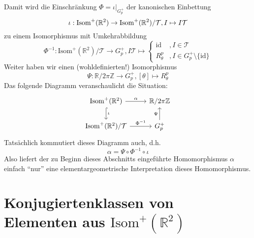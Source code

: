 \documentclass[a4paper, ngerman]{article}
\numberwithin{equation}{chapter}
\theoremstyle{plain}
\theoremstyle{definition}
\newcommand{\id}{\ensuremath{\text{id}}}
\newcommand{\geradisometr}{\ensuremath{\mathrm{Isom}^+(\mathbb R^2)}}
\begin{document}
Damit wird die Einschränkung \(\Phi = \iota|_{G_p^+}\) der kanonischen Einbettung
\begin{equation*}
    \iota: \geradisometr \break \to \geradisometr/\mathcal T, I \mapsto I\mathcal T
\end{equation*}
zu einem Isomorphismus mit Umkehrabbildung 
\begin{equation*}
    \Phi^{-1}: \geradisometr/\mathcal T \to G_p^+, I\mathcal T \mapsto 
    \begin{cases}
        \id &, I \in \mathcal T \\
        R_\theta^p &, I \in G_p^+\setminus \{\id\}
    \end{cases}
\end{equation*}
Weiter haben wir einen (wohldefinierten!) Isomorphismus 
\begin{equation*}
    \Psi: \mathbb R/2\pi\mathbb Z \to G_p^+, [\theta] \mapsto R_\theta^p
\end{equation*}
Das folgende Diagramm veranschaulicht die Situation:
\begin{equation*}
    \begin{tikzcd}
        \geradisometr \arrow[hook]{d}{\iota} \arrow{r}{\alpha} & \mathbb R/2\pi\mathbb Z \\
        \geradisometr/\mathcal T \arrow{r}{\Phi^{-1}} & G_p^+ \arrow{u}{\Psi}
    \end{tikzcd}
\end{equation*}
Tatsächlich kommutiert dieses Diagramm auch, d.h. 
\begin{equation*}
    \alpha = \Psi\circ \Phi^{-1}\circ \iota
\end{equation*}
Also liefert der zu Beginn dieses Abschnitts eingeführte Homomorphismus \(\alpha\) einfach "`nur"' eine elementargeometrische Interpretation dieses Homomorphismus. 

\section{Konjugiertenklassen von Elementen aus \(\geradisometr\)}\label{sec:konjugiertenklassen-gerader-isometrien}
\end{document}
